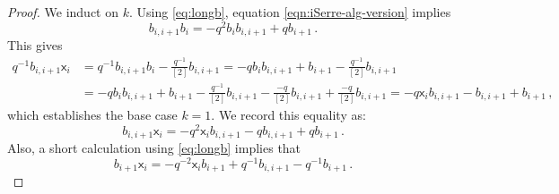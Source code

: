 \documentclass[10pt]{amsart}
\numberwithin{equation}{section}
\theoremstyle{definition}
\newcommand{\xxb}{\mathsf{x}}
\begin{document}
\begin{proof}
We induct on $k$. 
Using \eqref{eq:longb}, 
equation \eqref{eqn:iSerre-alg-version}
implies
\[
b_{i,i+1} b_{i} = -q^2b_{i}b_{i,i+1} + qb_{i+1} \, .
\]
This gives
\begin{align*}
q^{-1}b_{i,i+1}\xxb_i &= q^{-1}b_{i,i+1} b_i - \frac{q^{-1}}{[2]}b_{i,i+1} = -qb_{i}b_{i,i+1}  + b_{i+1} - \frac{q^{-1}}{[2]}b_{i,i+1} \\
&= -qb_{i}b_{i,i+1} + b_{i+1} - \frac{q^{-1}}{[2]}b_{i,i+1} - \frac{-q}{[2]}b_{i,i+1} + \frac{-q}{[2]}b_{i,i+1}
=-q\xxb_{i}b_{i,i+1} - b_{i,i+1} + b_{i+1} \, ,
\end{align*}
which establishes the base case $k=1$. 
We record this equality as:
\[
b_{i,i+1}\xxb_i = -q^2\xxb_{i}b_{i,i+1} -qb_{i,i+1} + qb_{i+1} \, .
\]
Also, a short calculation using \eqref{eq:longb} implies that
\[
b_{i+1}\xxb_{i} = -q^{-2}\xxb_{i}b_{i+1} + q^{-1}b_{i,i+1} - q^{-1}b_{i+1} \, .
\]


\end{proof}
\end{document}
